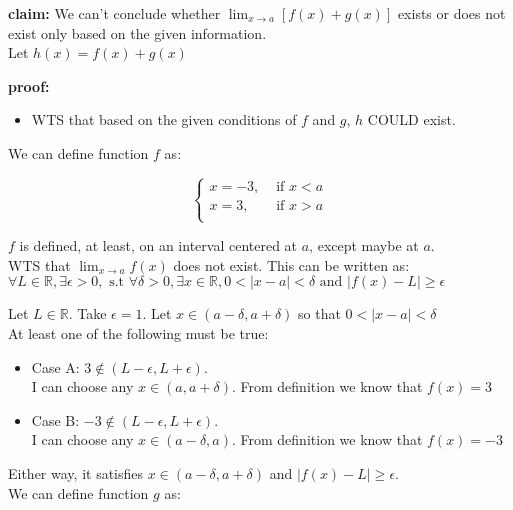 \documentclass[12pt]{exam}
\newcommand {\DS} [1] {${\displaystyle #1}$}
\newcommand{\vv}{\vspace{.2cm}}
\newcommand{\R}{\mathbb{R}}
\begin{document}
\begin{enumerate}
\vv  

\textbf{claim: } We can't conclude whether \DS{\lim_{x \to a}\left[f(x) + g(x) \right]} exists or does not exist only based on the given information. \\
Let $h(x) = f(x) + g(x)$
\vv

\textbf{proof: } \\
	\begin{itemize}
		\item WTS that based on the given conditions of $f$ and $g$, $h$ COULD exist.
	\end{itemize}

We can define function $f$ as: 

$$
\begin{cases}
	x = -3, &\text{ if }x < a\\
	x = 3, &\text{ if } x > a\\
\end{cases}
$$

$f$ is defined, at least, on an interval centered at $a$, except maybe at $a$.\\

WTS that \DS{\lim_{x \to a} f(x)} does not exist.
This can be written as: $\forall L \in \R, \exists \epsilon > 0, \mbox{ s.t } \forall \delta > 0, \exists x \in \R,
 0 < |x - a| < \delta \mbox{ and } |f(x) - L| \geq \epsilon$

Let $L \in \R$. Take $\epsilon = 1$. Let $x \in (a - \delta, a + \delta)$ so that $0 < |x - a| < \delta$\\
At least one of the following must be true:

\begin{itemize}
	\item Case A: $3 \notin (L - \epsilon, L + \epsilon).$ \\ 
	I can choose any $x \in (a, a + \delta)$. From definition we know that $f(x) = 3$
\end{itemize}

\begin{itemize}
	\item Case B: $-3 \notin (L - \epsilon, L + \epsilon).$ \\ 
	I can choose any $x \in (a - \delta, a )$. From definition we know that $f(x) = -3$
\end{itemize}

Either way, it satisfies $x \in (a - \delta, a + \delta)$ and $|f(x) - L| \geq \epsilon$. \\


We can define function $g$ as: 


\end{enumerate}
\end{document}
